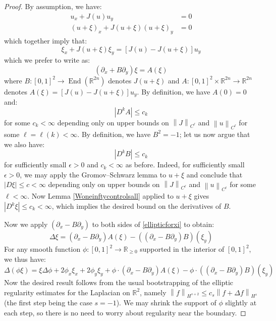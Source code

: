 \documentclass[12pt]{article}
\theoremstyle{definition}
\theoremstyle{remark}
\numberwithin{equation}{subsection}
\newcommand{\RR}{\mathbb R}
\begin{document}
\begin{proof}
By assumption, we have:
\begin{align}
u_x+J(u)u_y&=0\\
(u+\xi)_x+J(u+\xi)(u+\xi)_y&=0
\end{align}
which together imply that:
\begin{equation}
\xi_x+J(u+\xi)\xi_y=[J(u)-J(u+\xi)]u_y
\end{equation}
which we prefer to write as:
\begin{equation}\label{ellipticforxi}
(\partial_x+B\partial_y)\xi=A(\xi)
\end{equation}
where $B:[0,1]^2\to\operatorname{End}(\RR^{2n})$ denotes $J(u+\xi)$ and $A:[0,1]^2\times\RR^{2n}\to\RR^{2n}$ denotes $A(\xi)=[J(u)-J(u+\xi)]u_y$.  By definition, we have $A(0)=0$ and:
\begin{equation}\label{boundonA}
\left|D^kA\right|\leq c_k
\end{equation}
for some $c_k<\infty$ depending only on upper bounds on $\left\|J\right\|_{C^\ell}$ and $\left\|u\right\|_{C^\ell}$ for some $\ell=\ell(k)<\infty$.  By definition, we have $B^2=-1$; let us now argue that we also have:
\begin{equation}\label{boundonB}
\left|D^kB\right|\leq c_k
\end{equation}
for sufficiently small $\epsilon>0$ and $c_k<\infty$ as before.  Indeed, for sufficiently small $\epsilon>0$, we may apply the Gromov--Schwarz lemma to $u+\xi$ and conclude that $|D\xi|\leq c<\infty$ depending only on upper bounds on $\left\|J\right\|_{C^\ell}$ and $\left\|u\right\|_{C^\ell}$ for some $\ell<\infty$.  Now Lemma \ref{Woneinftycontrolsall} applied to $u+\xi$ gives $|D^k\xi|\leq c_k<\infty$, which implies the desired bound on the derivatives of $B$.

Now we apply $(\partial_x-B\partial_y)$ to both sides of \eqref{ellipticforxi} to obtain:
\begin{equation}
\Delta\xi=(\partial_x-B\partial_y)A(\xi)-((\partial_x-B\partial_y)B)(\xi_y)
\end{equation}
For any smooth function $\phi:[0,1]^2\to\RR_{\geq 0}$ supported in the interior of $[0,1]^2$, we thus have:
\begin{equation*}
\Delta(\phi\xi)=\xi\Delta\phi+2\phi_x\xi_x+2\phi_y\xi_y+\phi\cdot(\partial_x-B\partial_y)A(\xi)-\phi\cdot((\partial_x-B\partial_y)B)(\xi_y)
\end{equation*}
Now the desired result follows from the usual bootstrapping of the elliptic regularity estimates for the Laplacian on $\RR^2$, namely $\left\|f\right\|_{H^{s+2}}\leq c_s\left\|f+\Delta f\right\|_{H^s}$ (the first step being the case $s=-1$).  We may shrink the support of $\phi$ slightly at each step, so there is no need to worry about regularity near the boundary.
\end{proof}
\end{document}
